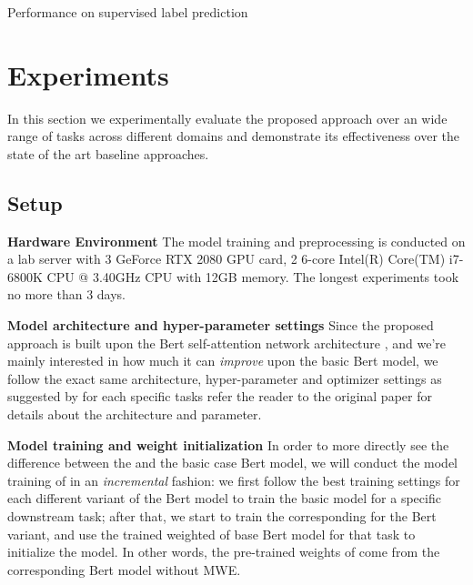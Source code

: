 \begin{table}
\begin{center}
   \caption{Performance on supervised label prediction}
   \label{tab:glue_results}
\end{center}
\end{table}



\section{Experiments}\label{sec:experiments}

In this section we experimentally evaluate the proposed approach over an wide range of tasks across different domains and demonstrate its effectiveness over the state of the art baseline approaches.




\subsection{Setup}

\noindent \textbf{Hardware Environment}
The model training and preprocessing is conducted on a lab server with 3 
GeForce RTX 2080 GPU card, 2 6-core Intel(R) Core(TM) i7-6800K CPU @ 3.40GHz CPU with 12GB memory. The longest experiments took no more than 3 days.


\noindent \textbf{Model architecture and hyper-parameter settings}
Since the proposed \BertMWE approach is built upon the Bert self-attention network architecture \cite{devlin2018bert},
and 
we're mainly interested in how much it can \textit{improve} upon the basic Bert model, 
we follow the exact same architecture, hyper-parameter and optimizer settings as suggested by 
\cite{devlin2018bert} for each specific tasks 
refer the reader to the original paper for details about the architecture and parameter.

\noindent \textbf{Model training and weight initialization}
In order to more directly see the difference between the \BertMWE and the basic case Bert model, we will conduct the model training of \BertMWE in an \textit{incremental} fashion:
we first follow the best training settings for each different variant of the Bert model  to train the basic model for a specific downstream task; after that, we start to train the corresponding \BertMWE 
for the Bert variant, and use the trained weighted of base Bert model for that task to initialize the \BertMWE model. In other words, the pre-trained weights of \BertMWE come from the corresponding Bert model without MWE.

